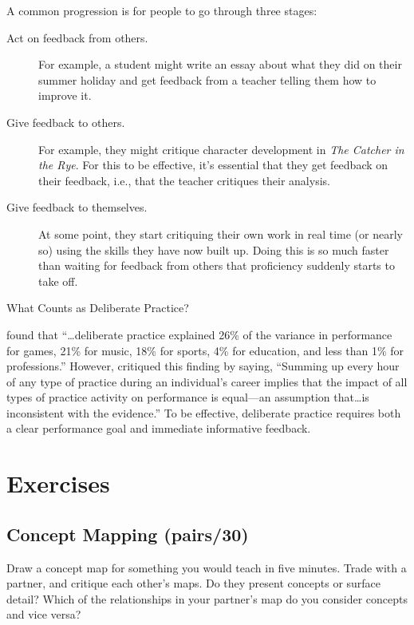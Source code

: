 A common progression is for people to go through three stages:

\begin{description}
\item[Act on feedback from others.]
For example, a student might write an essay about what they did on
their summer holiday and get feedback from a teacher telling them
how to improve it.
\item[Give feedback to others.]
For example, they might critique character development in \emph{The
Catcher in the Rye}. For this to be effective, it's essential that
they get feedback on their feedback, i.e., that the teacher critiques
their analysis.
\item[Give feedback to themselves.]
At some point, they start critiquing their own work in real time (or
nearly so) using the skills they have now built up. Doing this is so
much faster than waiting for feedback from others that proficiency
suddenly starts to take off.
\end{description}

\begin{aside}{What Counts as Deliberate Practice?}

\cite{Macn2014} found that ``{\ldots}deliberate practice
explained 26\% of the variance in performance for games, 21\% for music,
18\% for sports, 4\% for education, and less than 1\% for professions.''
However, \cite{Eric2016} critiqued this finding by saying, ``Summing
up every hour of any type of practice during an individual's career
implies that the impact of all types of practice activity on
performance is equal---an assumption that{\ldots}is inconsistent
with the evidence.'' To be effective, deliberate practice requires both
a clear performance goal and immediate informative feedback.

\end{aside}

\section{Exercises}\label{s:memory-exercises}

\subsection*{Concept Mapping (pairs/30)}

Draw a concept map for something you would teach in five minutes. Trade
with a partner, and critique each other's maps. Do they present concepts
or surface detail? Which of the relationships in your partner's map do
you consider concepts and vice versa?

